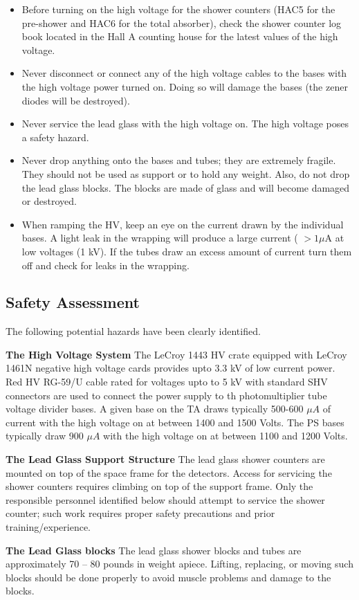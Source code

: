 \documentclass[12pt]{article}
\begin{document}
\begin{itemize}
\item{Before turning on the high voltage for the shower counters (HAC5 
for the pre-shower and HAC6 for the total absorber), check the shower
counter log book located in the Hall A counting house for the latest
values of the high voltage.}

\item{Never disconnect or connect any of the high voltage cables to 
the bases with the high voltage power turned on.  Doing so will damage
the bases (the zener diodes will be destroyed).}

\item{Never service the lead glass with the high voltage on.  The
high voltage poses a safety hazard.}

\item{Never drop anything onto the bases and tubes; they are 
extremely fragile.  They should not be used as support or to hold any
weight.  Also, do not drop the lead glass blocks.  The blocks are made
of glass and will become damaged or destroyed.}

\item{When ramping the HV, keep an eye on the current drawn 
by the individual bases.  A light leak in the wrapping will produce a
large current ( $ > 1 \mu$A at low voltages (1 kV).  If the tubes
draw an excess amount of current turn them off and check for leaks
in the wrapping.}
\end{itemize}
%

\subsection{Safety Assessment}
The following potential hazards have been clearly identified.
\begin{description}
\item {\bf The High Voltage System} The LeCroy 1443 HV crate equipped
with LeCroy 1461N negative high voltage cards provides upto 3.3 kV of
low current power.  Red HV RG-59/U cable rated for voltages upto to 5
kV with standard SHV connectors are used to connect the power supply to
th photomultiplier tube voltage divider bases.  A given base on the
TA draws typically 500-600 $\mu A$ of current with the high voltage
on at between 1400 and 1500 Volts.  The PS bases typically draw 900
$\mu A$  with the high voltage on at between 1100 and 1200 Volts.
%
\item {\bf The Lead Glass Support Structure}
The lead glass shower counters are mounted on top of the space
frame for the detectors.  Access for servicing the shower counters
requires climbing on top of the support frame.  Only the responsible
personnel identified below should attempt to service the shower counter;
such work requires proper safety precautions and prior training/experience.
\item {\bf The Lead Glass blocks}
The lead glass shower blocks and tubes are approximately 70 -- 80 pounds
in weight apiece.  Lifting, replacing, or moving such blocks should
be done properly to avoid muscle problems and damage to the blocks.
\end{description}
%
\end{document}

